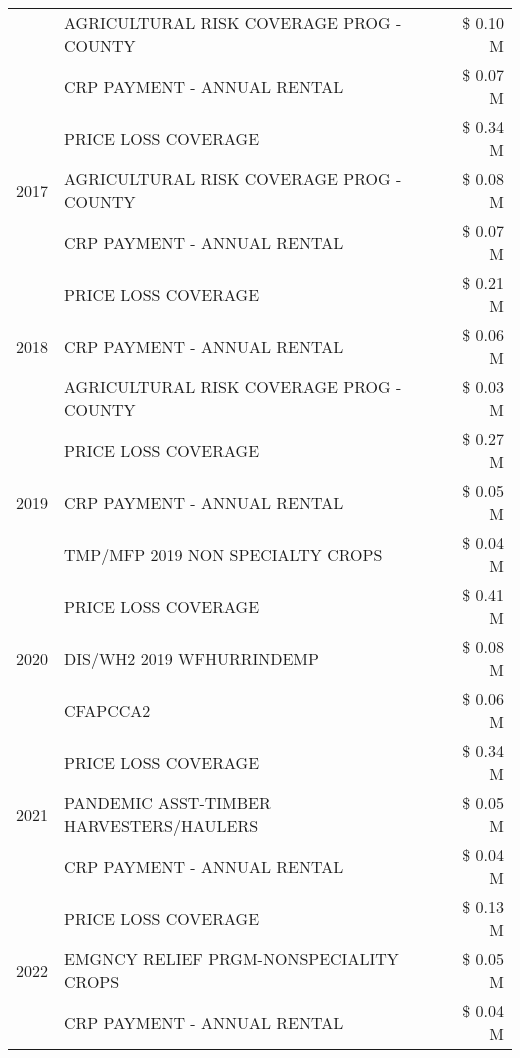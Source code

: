 \begin{tabular}{llr}
 & AGRICULTURAL RISK COVERAGE PROG - COUNTY & \$ 0.10 M \\
 & CRP PAYMENT - ANNUAL RENTAL & \$ 0.07 M \\
\cline{1-3}
\multirow[t]{3}{*}{2017} & PRICE LOSS COVERAGE & \$ 0.34 M \\
 & AGRICULTURAL RISK COVERAGE PROG - COUNTY & \$ 0.08 M \\
 & CRP PAYMENT - ANNUAL RENTAL & \$ 0.07 M \\
\cline{1-3}
\multirow[t]{3}{*}{2018} & PRICE LOSS COVERAGE & \$ 0.21 M \\
 & CRP PAYMENT - ANNUAL RENTAL & \$ 0.06 M \\
 & AGRICULTURAL RISK COVERAGE PROG - COUNTY & \$ 0.03 M \\
\cline{1-3}
\multirow[t]{3}{*}{2019} & PRICE LOSS COVERAGE & \$ 0.27 M \\
 & CRP PAYMENT - ANNUAL RENTAL & \$ 0.05 M \\
 & TMP/MFP 2019 NON SPECIALTY CROPS & \$ 0.04 M \\
\cline{1-3}
\multirow[t]{3}{*}{2020} & PRICE LOSS COVERAGE & \$ 0.41 M \\
 & DIS/WH2 2019 WFHURRINDEMP & \$ 0.08 M \\
 & CFAPCCA2 & \$ 0.06 M \\
\cline{1-3}
\multirow[t]{3}{*}{2021} & PRICE LOSS COVERAGE & \$ 0.34 M \\
 & PANDEMIC ASST-TIMBER HARVESTERS/HAULERS & \$ 0.05 M \\
 & CRP PAYMENT - ANNUAL RENTAL & \$ 0.04 M \\
\cline{1-3}
\multirow[t]{3}{*}{2022} & PRICE LOSS COVERAGE & \$ 0.13 M \\
 & EMGNCY RELIEF PRGM-NONSPECIALITY CROPS & \$ 0.05 M \\
 & CRP PAYMENT - ANNUAL RENTAL & \$ 0.04 M \\
\cline{1-3}
\bottomrule
\end{tabular}
